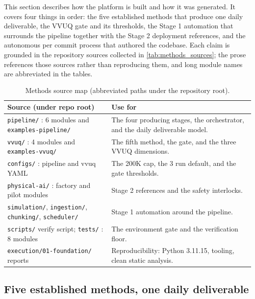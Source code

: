 
This section describes how the platform is built and how it was generated. It
covers four things in order: the five established methods that produce one daily
deliverable, the VVUQ gate and its thresholds, the Stage 1 automation that
surrounds the pipeline together with the Stage 2 deployment references, and the
autonomous per commit process that authored the codebase. Each claim is grounded
in the repository sources collected in \autoref{tab:methods_sources}; the prose
references those sources rather than reproducing them, and long module names are
abbreviated in the tables.

\begin{table}[H]
\caption{Methods source map (abbreviated paths under the repository root).}
\label{tab:methods_sources}
\centering
\begin{tabularx}{\textwidth}{L{4.8cm} >{\raggedright\arraybackslash}X}
\toprule
\textbf{Source (under repo root)} & \textbf{Use for} \\
\midrule
  \texttt{pipeline/} : 6 modules and \texttt{examples-pipeline/} & The four producing stages, the orchestrator, and the daily deliverable model. \\
  \texttt{vvuq/} : 4 modules and \texttt{examples-vvuq/} & The fifth method, the gate, and the three VVUQ dimensions. \\
  \texttt{configs/} : pipeline and vvuq YAML & The 200K cap, the 3 run default, and the gate thresholds. \\
  \texttt{physical-ai/} : factory and pilot modules & Stage 2 references and the safety interlocks. \\
  \texttt{simulation/}, \texttt{ingestion/}, \texttt{chunking/}, \texttt{scheduler/} & Stage 1 automation around the pipeline. \\
  \texttt{scripts/} verify script; \texttt{tests/} : 8 modules & The environment gate and the verification floor. \\
  \texttt{execution/01-foundation/} reports & Reproducibility: Python 3.11.15, tooling, clean static analysis. \\
\bottomrule
\end{tabularx}
\end{table}

\subsection{Five established methods, one daily deliverable}

